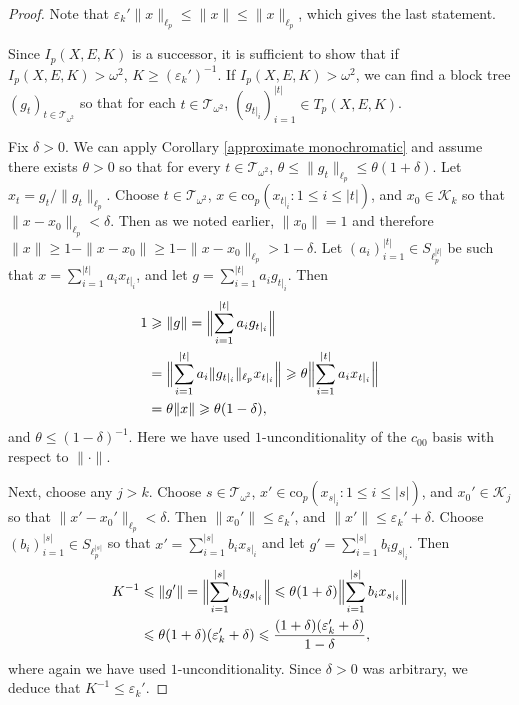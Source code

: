 \documentclass[12pt]{amsart}
\theoremstyle{definition}
\newcommand{\kkk}{\mathcal{K}}
\newcommand{\ttt}{\mathcal{T}}
\begin{document}
\begin{proof} Note that $\varepsilon_k'\|x\|_{\ell_p}\leqslant \|x\|\leqslant \|x\|_{\ell_p}$, which gives the last statement.  


Since $I_p(X, E, K)$ is a successor, it is sufficient to show that if $I_p(X, E, K)>\omega^2$, $K\geqslant (\varepsilon_k')^{-1}$. If $I_p(X, E, K)>\omega^2$, we can find a block tree $(g_t)_{t\in \ttt_{\omega^2}}$ so that for each $t\in \ttt_{\omega^2}$, $(g_{t|_i})_{i=1}^{|t|}\in T_p(X, E, K)$.   

Fix $\delta>0$.  We can apply Corollary \ref{approximate monochromatic} and assume there exists $\theta>0$ so that for every $t\in \ttt_{\omega^2}$, $\theta\leqslant \|g_t\|_{\ell_p} \leqslant \theta(1+\delta)$.  Let $x_t= g_t/\|g_t\|_{\ell_p}$.  Choose $t\in \ttt_{\omega^2}$, $x\in \text{co}_p(x_{t|_i}: 1\leqslant i\leqslant |t|)$, and $x_0\in \kkk_k$ so that $\|x- x_0\|_{\ell_p}<\delta$.  Then as we noted earlier, $\|x_0\|=1$ and therefore $\|x\|\geqslant 1- \|x-x_0\|\geqslant 1- \|x-x_0\|_{\ell_p}>1-\delta$.  Let $(a_i)_{i=1}^{|t|}\in S_{\ell_p^{|t|}}$ be such that $x= \sum_{i=1}^{|t|} a_i x_{t|_i}$, and let $g= \sum_{i=1}^{|t|} a_i g_{t|_i}$.  Then \begin{align*} 1 & \geqslant \|g\| = \Bigl\|\sum_{i=1}^{|t|} a_i g_{t|_i}\Bigr\| \\ & = \Bigl\|\sum_{i=1}^{|t|} a_i \|g_{t|_i}\|_{\ell_p} x_{t|_i}\Bigr\| \geqslant \theta \Bigl\|\sum_{i=1}^{|t|} a_i  x_{t|_i}\Bigr\| \\ & = \theta \|x\| \geqslant \theta (1- \delta), \end{align*} and $\theta\leqslant (1-\delta)^{-1}$.  Here we have used $1$-unconditionality of the $c_{00}$ basis with respect to $\|\cdot\|$.    

Next, choose any $j>k$.  Choose $s\in \ttt_{\omega^2}$, $x'\in \text{co}_p(x_{s|_i}: 1\leqslant i\leqslant |s|)$, and $x_0'\in \kkk_j$ so that $\|x'- x_0'\|_{\ell_p}< \delta$.  Then $\|x_0'\|\leqslant \varepsilon_k'$, and $\|x'\|\leqslant \varepsilon_k'+\delta$.  Choose $(b_i)_{i=1}^{|s|}\in S_{\ell_p^{|s|}}$ so that $x'=\sum_{i=1}^{|s|} b_i x_{s|_i}$ and let $g'=\sum_{i=1}^{|s|}b_i g_{s|_i}$.  Then \begin{align*} K^{-1} & \leqslant \|g'\| = \Bigl\|\sum_{i=1}^{|s|} b_i g_{s|_i}\Bigr\|   \leqslant \theta(1+\delta)\Bigl\|\sum_{i=1}^{|s|} b_i x_{s|_i}\Bigr\| \\ & \leqslant \theta(1+\delta) (\varepsilon'_k+\delta) \leqslant \frac{(1+\delta) (\varepsilon_k'+\delta)}{1-\delta}, \end{align*} where again we have used $1$-unconditionality.  Since $\delta>0$ was arbitrary, we deduce that $K^{-1}\leqslant \varepsilon_k'$.  




\end{proof}
\end{document}
